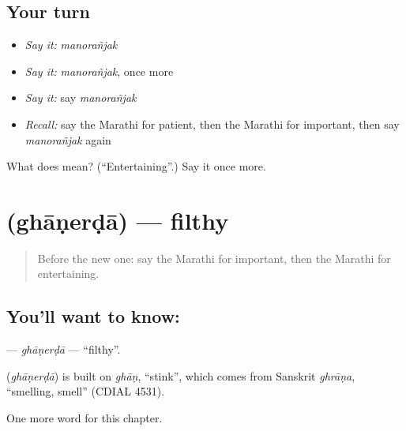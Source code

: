 \subsection*{Your turn}
\begin{itemize}
\raggedright
  \item \emph{Say it:} \emph{manorañjak}
  \item \emph{Say it:} \emph{manorañjak}, once more
  \item \emph{Say it:} say \emph{manorañjak}
  \item \emph{Recall:} say the Marathi for patient, then the Marathi for important, then say \emph{manorañjak} again
\end{itemize}

\begin{tcolorbox}[breakable,colback=teal!4,colframe=teal!35!black,title={Before you move on}]
What does  mean? (\textquotedblleft{}Entertaining\textquotedblright{}.) Say it once more.
\end{tcolorbox}
\section[\texorpdfstring{\mr{घाणेरडा} (ghāṇerḍā)}{घाणेरडा (ghāṇerḍā)}]{ (ghāṇerḍā) — filthy}

\label{lesson:MR-C234-ghanerda}



\begin{quote}
Before the new one: say the Marathi for important, then the Marathi for entertaining.
\end{quote}

\subsection*{You'll want to know: }
\textbf{} — \emph{ghāṇerḍā} — \textquotedblleft{}filthy\textquotedblright{}.

\begin{cousinweb}
\textbf{} (\emph{ghāṇerḍā}) is built on \emph{ghāṇ}, \textquotedblleft{}stink\textquotedblright{}, which comes from Sanskrit \emph{ghrāṇa}, \textquotedblleft{}smelling, smell\textquotedblright{} (CDIAL 4531).
\end{cousinweb}

\begin{grammarlens}[title={What you've built}]
One more word for this chapter.
\end{grammarlens}

